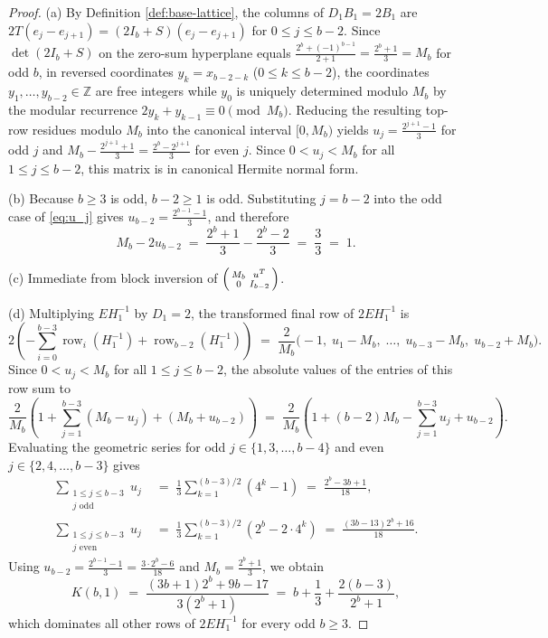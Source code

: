 \documentclass[11pt,a4paper]{article}
\theoremstyle{plain}
\theoremstyle{definition}
\newcommand{\Z}{\mathbb{Z}}
\newcommand{\row}{\operatorname{row}}
\begin{document}
\begin{proof}
(a) By Definition \ref{def:base-lattice}, the columns of $D_1 B_1 = 2 B_1$ are $2 T(e_j - e_{j+1}) = (2 I_b + S)(e_j - e_{j+1})$ for $0 \le j \le b-2$. Since $\det(2 I_b + S)$ on the zero-sum hyperplane equals $\frac{2^b + (-1)^{b-1}}{2+1} = \frac{2^b+1}{3} = M_b$ for odd $b$, in reversed coordinates $y_k = x_{b-2-k}$ ($0 \le k \le b-2$), the coordinates $y_1, \dots, y_{b-2} \in \Z$ are free integers while $y_0$ is uniquely determined modulo $M_b$ by the modular recurrence $2 y_{k} + y_{k-1} \equiv 0 \pmod{M_b}$. Reducing the resulting top-row residues modulo $M_b$ into the canonical interval $[0, M_b)$ yields $u_j = \frac{2^{j+1}-1}{3}$ for odd $j$ and $M_b - \frac{2^{j+1}+1}{3} = \frac{2^b - 2^{j+1}}{3}$ for even $j$. Since $0 < u_j < M_b$ for all $1 \le j \le b-2$, this matrix is in canonical Hermite normal form.

(b) Because $b \ge 3$ is odd, $b-2 \ge 1$ is odd. Substituting $j = b-2$ into the odd case of \eqref{eq:u_j} gives $u_{b-2} = \frac{2^{b-1}-1}{3}$, and therefore
\[
M_b - 2 u_{b-2} \;=\; \frac{2^b + 1}{3} - \frac{2^b - 2}{3} \;=\; \frac{3}{3} \;=\; 1.
\]

(c) Immediate from block inversion of $\begin{psmallmatrix} M_b & u^T \\ 0 & I_{b-2} \end{psmallmatrix}$.

(d) Multiplying $E H_1^{-1}$ by $D_1 = 2$, the transformed final row of $2 E H_1^{-1}$ is
\[
2\left(-\sum_{i=0}^{b-3} \row_i(H_1^{-1}) + \row_{b-2}(H_1^{-1})\right)
\;=\; \frac{2}{M_b}\big(-1,\; u_1 - M_b,\; \dots,\; u_{b-3} - M_b,\; u_{b-2} + M_b\big).
\]
Since $0 < u_j < M_b$ for all $1 \le j \le b-2$, the absolute values of the entries of this row sum to
\[
\frac{2}{M_b}\left(1 + \sum_{j=1}^{b-3}(M_b - u_j) + (M_b + u_{b-2})\right)
\;=\; \frac{2}{M_b}\left(1 + (b-2)M_b - \sum_{j=1}^{b-3} u_j + u_{b-2}\right).
\]
Evaluating the geometric series for odd $j \in \{1, 3, \dots, b-4\}$ and even $j \in \{2, 4, \dots, b-3\}$ gives
\begin{align*}
\sum_{\substack{1 \le j \le b-3 \\ j \text{ odd}}} u_j &\;=\; \frac{1}{3} \sum_{k=1}^{(b-3)/2} (4^k - 1) \;=\; \frac{2^b - 3b + 1}{18}, \\
\sum_{\substack{1 \le j \le b-3 \\ j \text{ even}}} u_j &\;=\; \frac{1}{3} \sum_{k=1}^{(b-3)/2} (2^b - 2 \cdot 4^k) \;=\; \frac{(3b - 13)2^b + 16}{18}.
\end{align*}
Using $u_{b-2} = \frac{2^{b-1}-1}{3} = \frac{3 \cdot 2^b - 6}{18}$ and $M_b = \frac{2^b+1}{3}$, we obtain
\[
K(b,1) \;=\; \frac{(3b + 1)2^b + 9b - 17}{3(2^b + 1)} \;=\; b + \frac{1}{3} + \frac{2(b-3)}{2^b + 1},
\]
which dominates all other rows of $2 E H_1^{-1}$ for every odd $b \ge 3$.
\end{proof}
\end{document}

